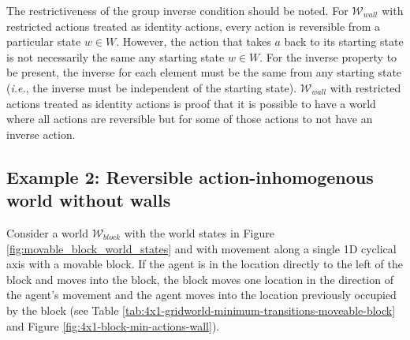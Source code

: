 The restrictiveness of the group inverse condition should be noted.
For $\mathscr{W}_{wall}$ with restricted actions treated as identity actions, every action is reversible from a particular state $w \in W$.
However, the action that takes $a$ back to its starting state is not necessarily the same any starting state $w \in W$.
For the inverse property to be present, the inverse for each element must be the same from any starting state (\textit{i.e.}, the inverse must be independent of the starting state).
$\mathscr{W}_{wall}$ with restricted actions treated as identity actions is proof that it is possible to have a world where all actions are reversible but for some of those actions to not have an inverse action.


\subsection{Example 2: Reversible action-inhomogenous world without walls}

Consider a world $\mathscr{W}_{block}$ with the world states in Figure \ref{fig:movable_block_world_states} and with movement along a single 1D cyclical axis with a movable block.
If the agent is in the location directly to the left of the block and moves into the block, the block moves one location in the direction of the agent's movement and the agent moves into the location previously occupied by the block (see Table \ref{tab:4x1-gridworld-minimum-transitions-moveable-block} and Figure \ref{fig:4x1-block-min-actions-wall}).


